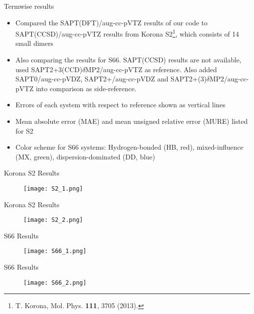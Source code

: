 \documentclass{beamer}
\begin{document}
        \begin{frame}{Termwise results}
            \begin{itemize}
                \item Compared the SAPT(DFT)/aug-cc-pVTZ results of our code to SAPT(CCSD)/aug-cc-pVTZ results from Korona S2\footnote{T. Korona, Mol. Phys. \textbf{111}, 3705 (2013).}, which consists of 14 small dimers
                \item Also comparing the results for S66. SAPT(CCSD) results are not available, used SAPT2+3(CCD)$\delta$MP2/aug-cc-pVTZ as reference. Also added SAPT0/aug-cc-pVDZ, SAPT2+/aug-cc-pVDZ and SAPT2+(3)$\delta$MP2/aug-cc-pVTZ into comparison as side-reference. 
                \item Errors of each system with respect to reference shown as vertical lines
                \item Mean absolute error (MAE) and mean unsigned relative error (MURE) listed for S2
                \item Color scheme for S66 systems: Hydrogen-bonded (HB, red), mixed-influence (MX, green), dispersion-dominated (DD, blue)
            \end{itemize}
        \end{frame}

        \begin{frame}{Korona S2 Results}
            \begin{figure}
                \centering
                \texttt{[image: S2\_1.png]}
            \end{figure}  
        \end{frame}

        \begin{frame}{Korona S2 Results}
            \begin{figure}
                \centering
                \texttt{[image: S2\_2.png]}
            \end{figure}  
        \end{frame}

        \begin{frame}{S66 Results}
            \begin{figure}
                \centering
                \texttt{[image: S66\_1.png]}
            \end{figure}  
        \end{frame}

        \begin{frame}{S66 Results}
            \begin{figure}
                \centering
                \texttt{[image: S66\_2.png]}
            \end{figure}  
        \end{frame}
\end{document}
